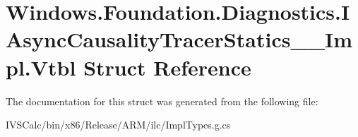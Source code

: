\hypertarget{struct_windows_1_1_foundation_1_1_diagnostics_1_1_i_async_causality_tracer_statics_____impl_1_1_vtbl}{}\section{Windows.\+Foundation.\+Diagnostics.\+I\+Async\+Causality\+Tracer\+Statics\+\_\+\+\_\+\+Impl.\+Vtbl Struct Reference}
\label{struct_windows_1_1_foundation_1_1_diagnostics_1_1_i_async_causality_tracer_statics_____impl_1_1_vtbl}


The documentation for this struct was generated from the following file\+:\begin{DoxyCompactItemize}
\item 
I\+V\+S\+Calc/bin/x86/\+Release/\+A\+R\+M/ilc/Impl\+Types.\+g.\+cs\end{DoxyCompactItemize}
